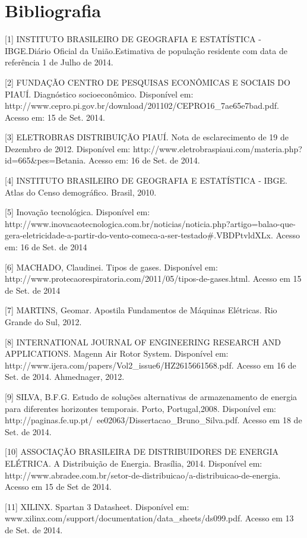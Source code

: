 \chapter[Bibliografia]{Bibliografia}


[1] INSTITUTO BRASILEIRO DE GEOGRAFIA E ESTATÍSTICA - IBGE.Diário Oficial da União.Estimativa de população residente com data de referência 1 de Julho de 2014. 

[2] FUNDAÇÃO CENTRO DE PESQUISAS ECONÔMICAS E SOCIAIS DO PIAUÍ. Diagnóstico socioeconômico. Disponível em: http://www.cepro.pi.gov.br/download/201102/CEPRO16_7ae65e7bad.pdf. Acesso em: 15 de Set. 2014.


[3] ELETROBRAS DISTRIBUIÇÃO PIAUÍ. Nota de esclarecimento de 19 de Dezembro de 2012. Disponível em: http://www.eletrobraspiaui.com/materia.php?id=665&pes=Betania. Acesso em: 16 de Set. de 2014.

[4] INSTITUTO BRASILEIRO DE GEOGRAFIA E ESTATÍSTICA - IBGE. Atlas do Censo demográfico. Brasil, 2010.
    
[5] Inovação tecnológica. Disponível em: http://www.inovacaotecnologica.com.br/noticias/noticia.php?artigo=balao-que-gera-eletricidade-a-partir-do-vento-comeca-a-ser-testado#.VBDPtvldXLx. Acesso em: 16 de Set. de 2014

[6] MACHADO, Claudinei. Tipos de  gases. Disponível em: http://www.protecaorespiratoria.com/2011/05/tipos-de-gases.html. Acesso em 15 de Set. de 2014

[7] MARTINS, Geomar. Apostila Fundamentos de Máquinas Elétricas. Rio Grande do Sul, 2012.

[8]  INTERNATIONAL JOURNAL OF ENGINEERING RESEARCH AND APPLICATIONS. Magenn Air Rotor System. Disponível em: http://www.ijera.com/papers/Vol2_issue6/HZ2615661568.pdf. Acesso em 16 de Set. de 2014. Ahmednager, 2012.

[9] SILVA, B.F.G. Estudo de soluções alternativas de armazenamento de energia para diferentes horizontes temporais. Porto, Portugal,2008.
Disponível em: http://paginas.fe.up.pt/~ee02063/Dissertacao_Bruno_Silva.pdf. Acesso em 18 de Set. de 2014.

[10] ASSOCIAÇÃO BRASILEIRA DE DISTRIBUIDORES DE ENERGIA ELÉTRICA. A Distribuição de Energia. Brasília, 2014. Disponível em: http://www.abradee.com.br/setor-de-distribuicao/a-distribuicao-de-energia. Acesso em 15 de Set de 2014.

[11] XILINX. Spartan 3 Datasheet. Disponível em: www.xilinx.com/support/documentation/data_sheets/ds099.pdf. Acesso em 13 de Set. de 2014.

